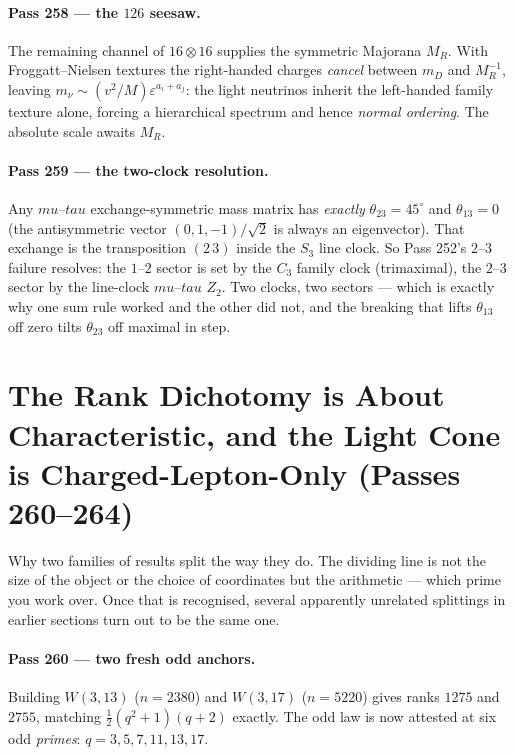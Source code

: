 \documentclass[12pt,a4paper]{article}
\def\mathbf#1{#1}%
\def\mu{mu}%
\def\tau{tau}%
\theoremstyle{definition}
\begin{document}
\paragraph{Pass 258 --- the $\mathbf{126}$ seesaw.} The remaining channel of
$\mathbf{16}\otimes\mathbf{16}$ supplies the symmetric Majorana $M_R$. With
Froggatt--Nielsen textures the right-handed charges \emph{cancel} between $m_D$
and $M_R^{-1}$, leaving $m_\nu\sim(v^2/M)\varepsilon^{a_i+a_j}$: the light
neutrinos inherit the left-handed family texture alone, forcing a hierarchical
spectrum and hence \emph{normal ordering}. The absolute scale awaits $M_R$.

\paragraph{Pass 259 --- the two-clock resolution.} Any $\mu$--$\tau$
exchange-symmetric mass matrix has \emph{exactly} $\theta_{23}=45^\circ$ and
$\theta_{13}=0$ (the antisymmetric vector $(0,1,-1)/\sqrt2$ is always an
eigenvector). That exchange is the transposition $(2\,3)$ inside the $S_3$ line
clock. So Pass 252's $2$--$3$ failure resolves: the $1$--$2$ sector is set by the
$C_3$ family clock (trimaximal), the $2$--$3$ sector by the line-clock $\mu$--$\tau$
$Z_2$. Two clocks, two sectors --- which is exactly why one sum rule worked and
the other did not, and the breaking that lifts $\theta_{13}$ off zero tilts
$\theta_{23}$ off maximal in step.


\section{The Rank Dichotomy is About Characteristic, and the Light Cone is Charged-Lepton-Only (Passes 260--264)}

\begin{plainbox}
Why two families of results split the way they do. The dividing line is not the
size of the object or the choice of coordinates but the arithmetic --- which prime you work
over. Once that is recognised, several apparently unrelated splittings in earlier sections
turn out to be the same one.
\end{plainbox}


\paragraph{Pass 260 --- two fresh odd anchors.} Building $W(3,13)$ ($n=2380$) and
$W(3,17)$ ($n=5220$) gives ranks $1275$ and $2755$, matching
$\tfrac12(q^2+1)(q+2)$ exactly. The odd law is now attested at six odd
\emph{primes}: $q=3,5,7,11,13,17$.
\end{document}
